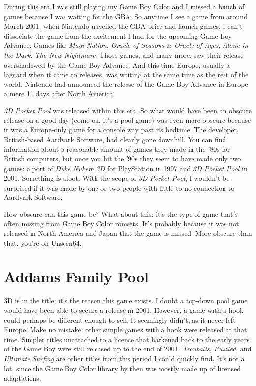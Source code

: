 \documentclass{book}
\begin{document}
During this era I was still playing my Game Boy Color and I missed a bunch of games because I was waiting for the GBA. So anytime I see a game from around March 2001, when Nintendo unveiled the GBA price and launch games, I can’t dissociate the game from the excitement I had for the upcoming Game Boy Advance. Games like \emph{Magi Nation}, \emph{Oracle of Seasons} \& \emph{Oracle of Ages}, \emph{Alone in the Dark: The New Nightmare}. Those games, and many more, saw their release overshadowed by the Game Boy Advance. And this time Europe, usually a laggard when it came to releases, was waiting at the same time as the rest of the world. Nintendo had announced the release of the Game Boy Advance in Europe a mere 11 days after North America.

\emph{3D Pocket Pool} was released within this era. So what would have been an obscure release on a good day (come on, it’s a pool game) was even more obscure because it was a Europe-only game for a console way past its bedtime. The developer, British-based Aardvark Software, had clearly gone downhill. You can find information about a reasonable amount of games they made in the ’80s for British computers, but once you hit the ’90s they seem to have made only two games: a port of \emph{Duke Nukem 3D} for PlayStation in 1997 and \emph{3D Pocket Pool} in 2001. Something is afoot. With the scope of \emph{3D Pocket Pool}, I wouldn’t be surprised if it was made by one or two people with little to no connection to Aardvark Software.

How obscure can this game be? What about this: it’s the type of game that’s often missing from Game Boy Color romsets. It’s probably because it was not released in North America and Japan that the game is missed. More obscure than that, you’re on Unseen64.

\FloatBarrier\needspace{10mm}\section*{Addams Family Pool}\nopagebreak[4]

3D is in the title; it’s the reason this game exists. I doubt a top-down pool game would have been able to secure a release in 2001. However, a game with a hook could perhaps be different enough to sell. It seemingly didn’t, as it never left Europe. Make no mistake: other simple games with a hook were released at that time. Simpler titles unattached to a licence that harkened back to the early years of the Game Boy were still released up to the end of 2001. \emph{Trouballs}, \emph{Puzzled}, and \emph{Ultimate Surfing} are other titles from this period I could quickly find. It’s not a lot, since the Game Boy Color library by then was mostly made up of licensed adaptations.
\end{document}
